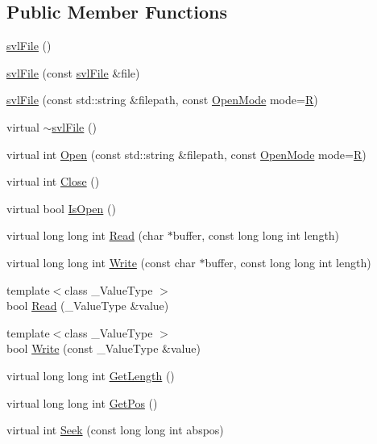 \subsection*{Public Member Functions}
\begin{DoxyCompactItemize}
\item 
\hyperlink{classsvl_file_a3bf2cd56dbbb1503e4a85289d9fa20d3}{svl\+File} ()
\item 
\hyperlink{classsvl_file_a092ae18727d1b6b95ce8e08297ce7309}{svl\+File} (const \hyperlink{classsvl_file}{svl\+File} \&file)
\item 
\hyperlink{classsvl_file_a537ab837bf88a0f8db65661a700c65ec}{svl\+File} (const std\+::string \&filepath, const \hyperlink{classsvl_file_a457656e908091234c3b92e11596ae1eb}{Open\+Mode} mode=\hyperlink{classsvl_file_a457656e908091234c3b92e11596ae1ebafe4e2c50609d24167be9c0c276c0c6c2}{R})
\item 
virtual \hyperlink{classsvl_file_a11bb01c4178002babdd83bb308222cb6}{$\sim$svl\+File} ()
\item 
virtual int \hyperlink{classsvl_file_ab433e010e565a684b6767dc3ab8f16cf}{Open} (const std\+::string \&filepath, const \hyperlink{classsvl_file_a457656e908091234c3b92e11596ae1eb}{Open\+Mode} mode=\hyperlink{classsvl_file_a457656e908091234c3b92e11596ae1ebafe4e2c50609d24167be9c0c276c0c6c2}{R})
\item 
virtual int \hyperlink{classsvl_file_a94d17e1c028e00296adae1006976abd5}{Close} ()
\item 
virtual bool \hyperlink{classsvl_file_a72f2b30878e3e55d5c6c987b2d4eb959}{Is\+Open} ()
\item 
virtual long long int \hyperlink{classsvl_file_a84cb50a2e47f112fa7b7cd24532e6661}{Read} (char $\ast$buffer, const long long int length)
\item 
virtual long long int \hyperlink{classsvl_file_af4517b3f890e9b56686b1e31728ada17}{Write} (const char $\ast$buffer, const long long int length)
\item 
{\footnotesize template$<$class \+\_\+\+Value\+Type $>$ }\\bool \hyperlink{classsvl_file_ab60935c3bcfaa69e07332059b3ab9a13}{Read} (\+\_\+\+Value\+Type \&value)
\item 
{\footnotesize template$<$class \+\_\+\+Value\+Type $>$ }\\bool \hyperlink{classsvl_file_abed84f5285fa5052a219d198fc5a2e0a}{Write} (const \+\_\+\+Value\+Type \&value)
\item 
virtual long long int \hyperlink{classsvl_file_a9ccc4b30233d9619c9c59e275f13e47b}{Get\+Length} ()
\item 
virtual long long int \hyperlink{classsvl_file_af846b5c2d9afff7e0112bdab62a1ea5d}{Get\+Pos} ()
\item 
virtual int \hyperlink{classsvl_file_ac7c60953728feb139668ce0e1ba7daff}{Seek} (const long long int abspos)
\end{DoxyCompactItemize}


